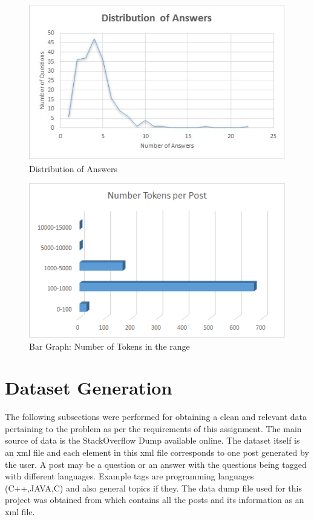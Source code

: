 \documentclass{sig-alternate-05-2015}
\begin{document}
\begin{figure}
\centering
  \includegraphics[width=0.75\linewidth]{AnswerDistribution.jpg}
  \caption{Distribution of Answers}
  \label{fig:distribution}
\end{figure}

\begin{figure}
\centering
  \includegraphics[width=0.75\linewidth]{NumberTokens.png}
  \caption{Bar Graph: Number of Tokens in the range}
  \label{fig:tokens}
\end{figure}

\section{Dataset Generation}
The following subsections were performed for obtaining a clean and relevant data pertaining to the problem as per the requirements of this assignment. The main source of data is the StackOverflow Dump available online. The dataset itself is an xml file and each element in this xml file corresponds to one post generated by the user. A post may be a question or an answer with the questions being tagged with different languages. Example tags are programming languages (C++,JAVA,C) and also general topics if they. The data dump file used for this project was obtained from \cite{stackexchange} which contains all the posts and its information as an xml file.
\end{document}
